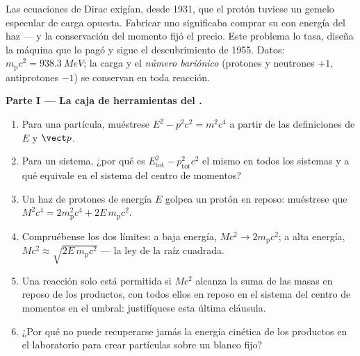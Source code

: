 \begin{problem}\label{pb:b3:relativistic-dynamics:1}
Las ecuaciones de Dirac exigían, desde 1931, que el protón tuviese un
gemelo especular de carga opuesta. Fabricar uno significaba comprar su
 con energía del haz --- y la conservación del momento fijó
el precio. Este problema lo tasa, diseña la máquina que lo pagó y sigue el
descubrimiento de 1955. Datos: $m_{\text{p}}c^2 = \qty{938.3}{MeV}$; la
carga y el \emph{número bariónico} (protones y neutrones $+1$, antiprotones
$-1$) se conservan en toda reacción.

\medskip\noindent\textbf{Parte I --- La caja de herramientas del .}
\begin{enumerate}
  \item Para una partícula, muéstrese $E^2 - p^2c^2 = m^2c^4$ a partir de
        las definiciones de $E$ y $\vect p$.
  \item Para un sistema, ¿por qué es $E_{\text{tot}}^2 -
        p_{\text{tot}}^2c^2$ el mismo en todos los sistemas y a qué
        equivale en el sistema del centro de momentos?
  \item Un haz de protones de energía $E$ golpea un protón en reposo:
        muéstrese que $M^2c^4 = 2m_{\text{p}}^2c^4 + 2E\,m_{\text{p}}c^2$.
  \item Compruébense los dos límites: a baja energía, $Mc^2 \to
        2m_{\text{p}}c^2$; a alta energía, $Mc^2 \approx
        \sqrt{2E\,m_{\text{p}}c^2}$ --- la ley de la raíz cuadrada.
  \item Una reacción solo está permitida si $Mc^2$ alcanza la suma de las
        masas en reposo de los productos, con todos ellos en reposo en el
        sistema del centro de momentos en el umbral: justifíquese esta
        última cláusula.
  \item ¿Por qué no puede recuperarse jamás la energía cinética de los
        productos en el laboratorio para crear partículas sobre un blanco
        fijo?
\end{enumerate}


\end{problem}
